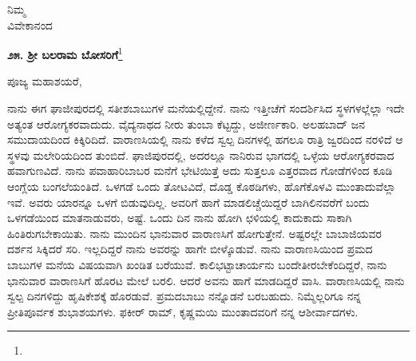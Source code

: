 \vspace{-0.5cm}

{\flushright
ನಿಮ್ಮ\\ವಿವೇಕಾನಂದ\par}

{\fontsize{12pt}{11.5pt}}

\vspace{-0.25cm}

\begin{center}
\textbf{೨೫. ಶ‍್ರೀ ಬಲರಾಮ ಬೋಸರಿಗೆ}\footnote{}
\end{center}

\vspace{-0.55cm}

\begin{flushright}
{\fontsize{12pt}{11.5pt}\selectfont{ಘಾಜೀಪುರ\\[-2pt] ೩೦ನೇ ಜನವರಿ ೧೮೯೦}}
\end{flushright}
\vspace{-0.4cm}

\noindent
ಪೂಜ್ಯ ಮಹಾಶಯರೆ,

ನಾನು ಈಗ ಘಾಜೀಪುರದಲ್ಲಿ ಸತೀಶಬಾಬುಗಳ ಮನೆಯಲ್ಲಿದ್ದೇನೆ. ನಾನು ಇತ್ತೀಚೆಗೆ ಸಂದರ್ಶಿಸಿದ ಸ್ಥಳಗಳಲ್ಲೆಲ್ಲಾ ಇದೇ ಅತ್ಯಂತ ಆರೋಗ್ಯಕರವಾದುದು. ವೈದ್ಯನಾಥದ ನೀರು ತುಂಬಾ ಕೆಟ್ಟದ್ದು, ಅಜೀರ್ಣಕಾರಿ. ಅಲಹಬಾದ್ ಜನ ಸಮುದಾಯದಿಂದ ಕಿಕ್ಕಿರಿದಿದೆ. ವಾರಾಣಸಿಯಲ್ಲಿ ನಾನು ಕಳೆದ ಸ್ವಲ್ಪ ದಿನಗಳಲ್ಲಿ ಹಗಲೂ ರಾತ್ರಿ ಜ್ವರದಿಂದ ನರಳಿದೆ \enginline{-} ಆ ಸ್ಥಳವು ಮಲೇರಿಯದಿಂದ ತುಂಬಿದೆ. ಘಾಜಿಪುರದಲ್ಲಿ, ಅದರಲ್ಲೂ ನಾನಿರುವ ಭಾಗದಲ್ಲಿ ಒಳ್ಳೆಯ ಆರೋಗ್ಯಕರವಾದ ಹವಾಗುಣವಿದೆ. ನಾನು ಪವಾಹಾರಿಬಾಬರ ಮನೆಗೆ ಭೇಟಿಯಿತ್ತೆ \enginline{-} ಅದು ಸುತ್ತಲೂ ಎತ್ತರವಾದ ಗೋಡೆಗಳಿಂದ ಕೂಡಿ ಆಂಗ್ಲೆಯ ಬಂಗಲೆಯಂತಿದೆ. ಒಳಗಡೆ ಒಂದು ತೋಟವಿದೆ, ದೊಡ್ಡ ಕೊಠಡಿಗಳು, ಹೊಗೆಕೊಳವಿ ಮುಂತಾದುವೆಲ್ಲಾ ಇವೆ. ಅವರು ಯಾರನ್ನೂ ಒಳಗೆ ಬಿಡುವುದಿಲ್ಲ. ಅವರಿಗೆ ಹಾಗೆ ಮಾಡಲಿಚ್ಚೆಯಿದ್ದರೆ ಬಾಗಿಲಿನವರೆಗೆ ಬಂದು ಒಳಗಡೆಯಿಂದ ಮಾತನಾಡುವರು, ಅಷ್ಟೆ. ಒಂದು ದಿನ ನಾನು ಹೋಗಿ ಛಳಿಯಲ್ಲಿ ಕಾದುಕಾದು ಸಾಕಾಗಿ ಹಿಂತಿರುಗಬೇಕಾಯಿತು. ನಾನು ಮುಂದಿನ ಭಾನುವಾರ ವಾರಾಣಸಿಗೆ ಹೋಗುತ್ತೇನೆ. ಅಷ್ಟರಲ್ಲೇ ಬಾಬಾಜಿಯವರ ದರ್ಶನ ಸಿಕ್ಕಿದರೆ ಸರಿ. ಇಲ್ಲದಿದ್ದರೆ ನಾನು ಅವರನ್ನು ಹಾಗೇ ಬೀಳ್ಕೊಡುವೆ. ನಾನು ವಾರಾಣಸಿಯಿಂದ ಪ್ರಮದ ಬಾಬುಗಳ ಮನೆಯ ವಿಷಯವಾಗಿ ಖಂಡಿತ ಬರೆಯುವೆ. ಕಾಲಿಭಟ್ಟಾಚಾರ್ಯನು ಬಂದೇತೀರಬೇಕೆಂದಿದ್ದರೆ, ನಾನು ಭಾನುವಾರ ವಾರಾಣಸಿಗೆ ಹೊರಟ ಮೇಲೆ ಬರಲಿ. ಆದರೆ ಅವನು ಹಾಗೆ ಮಾಡದಿದ್ದರೆ ವಾಸಿ. ವಾರಾಣಸಿಯಲ್ಲಿ ನಾನು ಸ್ವಲ್ಪ ದಿನಗಳಿದ್ದು ಹೃಷಿಕೇಶಕ್ಕೆ ಹೊರಡುವೆ. ಪ್ರಮದಬಾಬು ನನ್ನೊಡನೆ ಬರಬಹುದು. ನಿಮ್ಮೆಲ್ಲರಿಗೂ ನನ್ನ ಪ್ರೀತಿಪೂರ್ವಕ ಶುಭಾಶಯಗಳು. ಫಕೀರ್ ರಾಮ್, ಕೃಷ್ಣಮಯಿ ಮುಂತಾದವರಿಗೆ ನನ್ನ ಆಶೀರ್ವಾದಗಳು.

\vspace{-0.47cm}

